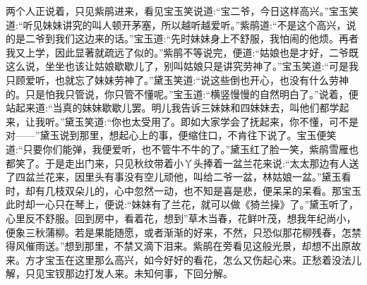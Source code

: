 \begin{parag}
    两个人正说着，只见紫鹃进来，看见宝玉笑说道:“宝二爷，今日这样高兴。”宝玉笑道:“听见妹妹讲究的叫人顿开茅塞，所以越听越爱听。”紫鹃道:“不是这个高兴，说的是二爷到我们这边来的话。”宝玉道:“先时妹妹身上不舒服，我怕闹的他烦。再者我又上学，因此显著就疏远了似的。”紫鹃不等说完，便道:“姑娘也是才好，二爷既这么说，坐坐也该让姑娘歇歇儿了，别叫姑娘只是讲究劳神了。”宝玉笑道:“可是我只顾爱听，也就忘了妹妹劳神了。”黛玉笑道:“说这些倒也开心，也没有什么劳神的。只是怕我只管说，你只管不懂呢。”宝玉道:“横竖慢慢的自然明白了。”说着，便站起来道:“当真的妹妹歇歇儿罢。明儿我告诉三妹妹和四妹妹去，叫他们都学起来，让我听。”黛玉笑道:“你也太受用了。即如大家学会了抚起来，你不懂，可不是对——”黛玉说到那里，想起心上的事，便缩住口，不肯往下说了。宝玉便笑道:“只要你们能弹，我便爱听，也不管牛不牛的了。”黛玉红了脸一笑，紫鹃雪雁也都笑了。于是走出门来，只见秋纹带着小丫头捧着一盆兰花来说:“太太那边有人送了四盆兰花来，因里头有事没有空儿顽他，叫给二爷一盆，林姑娘一盆。”黛玉看时，却有几枝双朵儿的，心中忽然一动，也不知是喜是悲，便呆呆的呆看。那宝玉此时却一心只在琴上，便说:“妹妹有了兰花，就可以做《猗兰操》了。”黛玉听了，心里反不舒服。回到房中，看着花，想到”草木当春，花鲜叶茂，想我年纪尚小，便象三秋蒲柳。若是果能随愿，或者渐渐的好来，不然，只恐似那花柳残春，怎禁得风催雨送。”想到那里，不禁又滴下泪来。紫鹃在旁看见这般光景，却想不出原故来。方才宝玉在这里那么高兴，如今好好的看花，怎么又伤起心来。正愁着没法儿解，只见宝钗那边打发人来。未知何事，下回分解。
\end{parag}